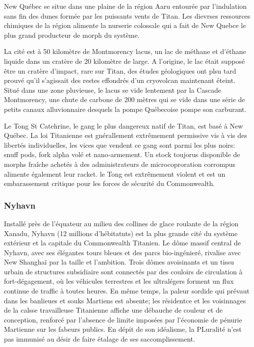                                                                      New Québec se situe dans une plaine de la région Aaru entourée par l'indulation sans fin des dunes formée par les puissants vents de Titan. Les dievrses ressources chimiques de la région alimente la nurserie colossale qui a fait de New Quebce le plus grand producteur de morph du système. 

                                                                     La cité est à 50 kilomètre de Montmorency lacus, un lac de méthane et d'éthane liquide dans un cratère de 20 kilomètre de large. A l'origine, le lac était supposé être un cratère d'impact, rare sur Titan, des études géologiques ont plsu tard prouvé qu'il s'agissait des restes effondrés d'un cryovolcan maintenant éteint. Situé dans une zone pluvieuse, le lacus se vide lentement par la Cascade Montmorency, une chute de carbone de 200 mètres qui se vide dans une série de petits canaux alluvionnaire desquels la pompe Québecoise pompe son carburant. 

                                                                     Le Tong St Catehrine, le gang le plus dangereux natif de Titan, est basé à New Québec. La loi Titanienne est gnérallement extrêmement permissive vis à vis des libertés individuelles, les vices que vendent ce gang sont parmi les plus noirs: snuff pods, fork alpha volé et nano-armement. Un stock toujorus disponible de morphs fraîche achetés à des administrateurs de microcoproration corrompus alimente également leur racket. le Tong est extrêmement violent et est un embarassement critique pour les forces de sécurité du Commonwealth. 

                                                                     \subsubsection{Nyhavn} \label{sec:nyhavn} 

                                                                     Installé près de l'équateur au milieu des collines de glace roulante de la région Xanadu, Nyhavn (12 millions d'hébitatnts) est la plus grande cité du système extérieur et la capitale du Commonwealth Titanien. Le dôme massif central de Nyhavn, avec ses élégantes tours bleues et des parcs bio-ingénieré, rivalise avec New Shanghaï par la taille et l'ambition. Trois dômes avoisinants et un tissu urbain de structures subsidiaire sont connectés par des couloirs de circulation à fort-dégagement, où les véhicules terrestres et les ultralégers forment un flux continue de traffic à toutes heures. En même temps, la paleur sordide qui prévaut dans les banlieues et souks Martiens est absente; les résidentce et les voisinnages de  la calsse travailleuse Titanienne affiche une débauche de couleur et de conception, renforcé par l'absence de limite imposées par l'économie de pénurie Martienne sur les fabeurs publics. En dépit de son idéalisme, la PLuralité n'est pas immunisé au désir de faire étalage de ses saccomplissement. 

